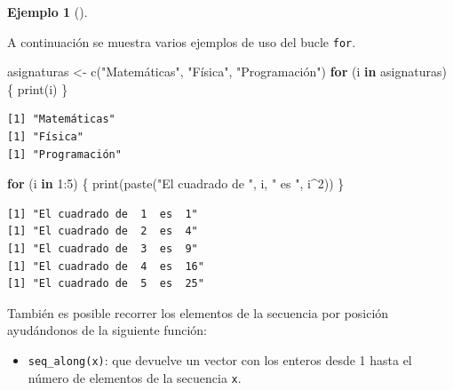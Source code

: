 \documentclass[
  spanish,
  a4paper,
]{scrreport}
\newenvironment{Shaded}{\begin{snugshade}}{\end{snugshade}}
\newcommand{\ControlFlowTok}[1]{\textcolor[rgb]{0.00,0.23,0.31}{\textbf{#1}}}
\newcommand{\DecValTok}[1]{\textcolor[rgb]{0.68,0.00,0.00}{#1}}
\newcommand{\FunctionTok}[1]{\textcolor[rgb]{0.28,0.35,0.67}{#1}}
\newcommand{\NormalTok}[1]{\textcolor[rgb]{0.00,0.23,0.31}{#1}}
\newcommand{\OtherTok}[1]{\textcolor[rgb]{0.00,0.23,0.31}{#1}}
\newcommand{\SpecialCharTok}[1]{\textcolor[rgb]{0.37,0.37,0.37}{#1}}
\newcommand{\StringTok}[1]{\textcolor[rgb]{0.13,0.47,0.30}{#1}}
\providecommand{\tightlist}{%
  \setlength{\itemsep}{0pt}\setlength{\parskip}{0pt}}
\theoremstyle{definition}
\theoremstyle{definition}
\newtheorem{example}{Ejemplo}[chapter]
\theoremstyle{remark}
\begin{document}
\begin{example}[]\protect\hypertarget{exm-bucle-iterarivo}{}\label{exm-bucle-iterarivo}

A continuación se muestra varios ejemplos de uso del bucle \texttt{for}.

\begin{Shaded}
\begin{Highlighting}[]
\NormalTok{asignaturas }\OtherTok{\textless{}{-}} \FunctionTok{c}\NormalTok{(}\StringTok{"Matemáticas"}\NormalTok{, }\StringTok{"Física"}\NormalTok{, }\StringTok{"Programación"}\NormalTok{)}
\ControlFlowTok{for}\NormalTok{ (i }\ControlFlowTok{in}\NormalTok{ asignaturas) \{}
  \FunctionTok{print}\NormalTok{(i)}
\NormalTok{\}}
\end{Highlighting}
\end{Shaded}

\begin{verbatim}
[1] "Matemáticas"
[1] "Física"
[1] "Programación"
\end{verbatim}

\begin{Shaded}
\begin{Highlighting}[]
\ControlFlowTok{for}\NormalTok{ (i }\ControlFlowTok{in} \DecValTok{1}\SpecialCharTok{:}\DecValTok{5}\NormalTok{) \{}
  \FunctionTok{print}\NormalTok{(}\FunctionTok{paste}\NormalTok{(}\StringTok{"El cuadrado de "}\NormalTok{, i, }\StringTok{" es "}\NormalTok{, i}\SpecialCharTok{\^{}}\DecValTok{2}\NormalTok{))}
\NormalTok{\}}
\end{Highlighting}
\end{Shaded}

\begin{verbatim}
[1] "El cuadrado de  1  es  1"
[1] "El cuadrado de  2  es  4"
[1] "El cuadrado de  3  es  9"
[1] "El cuadrado de  4  es  16"
[1] "El cuadrado de  5  es  25"
\end{verbatim}

\end{example}

También es posible recorrer los elementos de la secuencia por posición
ayudándonos de la siguiente función:

\begin{itemize}
\tightlist
\item
  \texttt{seq\_along(x)}: que devuelve un vector con los enteros desde 1
  hasta el número de elementos de la secuencia \texttt{x}.
\end{itemize}
\end{document}
